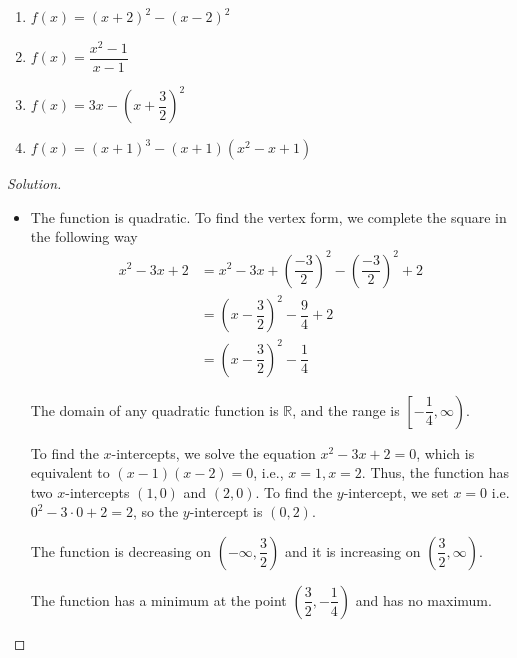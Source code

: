 \documentclass[12pt]{article}
\newenvironment{solution}{\begin{proof}[Solution]}{\end{proof}}
\begin{document}
\begin{enumerate}
\begin{enumerate}
			\item $f(x)=(x+2)^2-(x-2)^2$			
			
			\item $f(x)=\dfrac{x^2-1}{x-1}$
			
			\item $f(x)=3x-(x+\dfrac{3}{2})^2$
			
			\item $f(x)=(x+1)^3-(x+1)(x^2-x+1)$
	
		\end{enumerate}
		
		\begin{solution}
			\begin{itemize}
				\item[(a)] 	The function is quadratic. To find the vertex form, we complete the square in the following way
				\begin{align*}
					x^2-3x+2&=x^2-3x+\left(\dfrac{-3}{2}\right)^2-\left(\dfrac{-3}{2}\right)^2+2\\&= \left(x-\dfrac{3}{2}\right)^2-\dfrac{9}{4}+2\\
					&=\left(x-\dfrac{3}{2}\right)^2-\dfrac{1}{4}
				\end{align*}
				
				The domain of any quadratic function is $\mathbb{R}$, and the range is $\left[-\dfrac{1}{4},\infty \right).$
				
				To find the $x$-intercepts, we solve the equation $x^2-3x+2=0$, which is equivalent to $(x-1)(x-2)=0$, i.e., $x=1, x=2$. Thus, the function has two $x$-intercepts $(1,0)$ and $(2,0)$. To find the $y$-intercept, we set $x=0$ i.e. $0^2-3\cdot 0+2=2$, so the $y$-intercept is $(0,2)$.
				
				The function is decreasing on $(-\infty,\dfrac{3}{2})$ and it is increasing on $(\dfrac{3}{2},\infty)$.
				
				The function has a minimum at the point $\left(\dfrac{3}{2},-\dfrac{1}{4}\right)$ and has no maximum.
				
\end{itemize}
\end{solution}
\end{enumerate}
\end{document}
